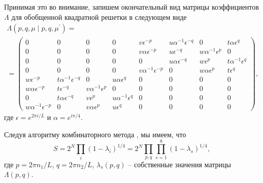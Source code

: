 \documentclass[utf8,12pt]{jetp}
\begin{document}
Принимая это во внимание, запишем окончательный вид матрицы коэффициентов $\Lambda$ для обобщенной квадратной решетки в следующем виде
\begin{multline}
\Lambda (p, q, \mu\; |\; p, q, \mu^{'}) = \\ =
\begin{pmatrix}
0 \!\!\!& 0 \!\!\!& 0 \!\!\!& 0\!\!\! & v \epsilon^{-p} \!\!\!& u \alpha^{-1} \epsilon^{-q} \!\!\!& 0 \!\!\!& t \alpha \epsilon^{q} \!\!\! \\
0 \!\!\!& 0 \!\!\!& 0 \!\!\!& 0 \!\!\!& v \alpha \epsilon^{-p}\!\!\! & u \epsilon^{-q}\!\!\! & w \alpha^{-1} \epsilon^{p}\!\!\! & 0\!\!\! \\
0 \!\!\!& 0 \!\!\!& 0 \!\!\!& 0\!\!\! & 0\!\!\! & u \alpha \epsilon^{-q} \!\!\!& w \epsilon^{p} \!\!\!& t \alpha^{-1} \epsilon^{q}\!\!\!  \\
0 \!\!\!& 0 \!\!\!& 0 \!\!\!& 0\!\!\! & v \alpha^{-1} \epsilon^{-p}\!\!\! & 0 \!\!\!& w \alpha \epsilon^{p} \!\!\!& t \epsilon^{q}\!\!\!  \\
w \epsilon^{-p} \!\!\!& t \alpha^{-1} \epsilon^{-q} \!\!\!& 0\!\!\! & u \alpha \epsilon^{q}\!\!\! & 0\!\!\! & 0\!\!\! & 0\!\!\! & 0\!\!\!  \\
w \alpha \epsilon^{-p}\!\!\! & t \epsilon^{-q} \!\!\!& v \alpha^{-1} \epsilon^{p}\!\!\! & 0 \!\!\!& 0\!\!\! & 0\!\!\! & 0\!\!\! & 0\!\!\! \\
0 \!\!\!& t \alpha \epsilon^{-q}\!\!\! & v \epsilon^{p} \!\!\!& u \alpha^{-1} \epsilon^{q}\!\!\! & 0 \!\!\!& 0\!\!\! & 0\!\!\! & 0 \!\!\! \\
w \alpha^{-1} \epsilon^{-p}\!\!\! & 0\!\!\! & v \alpha \epsilon^{p}\!\!\! & u \epsilon^{q} \!\!\!& 0\!\!\! & 0\!\!\! & 0 \!\!\!& 0 \!\!\!
\end{pmatrix},
\end{multline}
где $\epsilon = e^{2\pi i/L}$ и $\alpha = e^{i\pi/4}$.

Следуя алгоритму комбинаторного метода \cite{vdovichenko1965,vaks1966}, мы имеем, что
\begin{equation}
	S = 2^N \prod_{i} (1-\lambda_i)^{1/4} = 2^N	\prod_{p, q} \prod_{s=1}^{8} (1-\lambda_s)^{1/4},
	\label{Sformula}
\end{equation}
где $p=2\pi n_1/L$, $q=2\pi n_2/L$, $\lambda_s(p, q)$ -- собственные значения матрицы $\Lambda(p, q)$.
\end{document}
